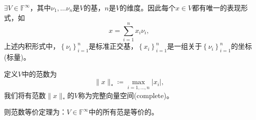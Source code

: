 \begin{theorem}[范数等价定理]
\label{theorem:equivalence-norm-theorem}
$\exists V \in \mathbb{F}^{\infty}$，其中$\nu_1, \ldots \nu_n$是$V$的基，$n$是$V$的维度。因此每个$x \in V$都有唯一的表现形式，如
\begin{equation}
  \label{eq:norm-equivalence-def}
  x = \sum_{i=1}^{n} x_i \nu_i,
\end{equation}
上述内积形式中，$\left\{ \nu_i \right\}_{i=1}^{n}$是标准正交基，$\left\{ x_i \right\}_{i=1}^{n}$是一组关于$\left\{ \nu_i \right\}_{i=1}^{n}$的坐标(标量)。

定义$V$中的范数为
\begin{equation*}
  \| x \|_{*} \coloneqq \max_{i=1,\ldots,n} \left| x_i \right|,
\end{equation*}
我们将有范数$  \| x \|_{*}$的$V$称为完整向量空间(complete)。

则范数等价定理为：$V \in \mathbb{F}^{\infty}$中的所有范是等价的。
\end{theorem}
